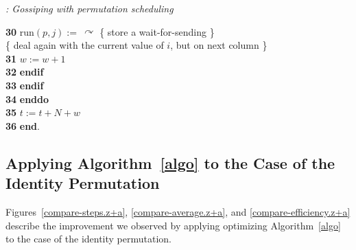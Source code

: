 \documentclass{elsart}
\newcommand{\keyw}[1]{\hbox{\bf #1}}
\begin{document}
\begin{alg}{\emph{: Gossiping with permutation scheduling}}
\begin{tabbing}
{\bf 30} \> \> \> \> \> \> $\mathrm{run}(p,  j) :=  \ \curvearrowright$ \>\>\>\>\>\>\> \{ store a wait-for-sending \} \\
         \> \> \> \> \> \> \{ deal again with the current value of $i$, but on next column \}\\
{\bf 31} \> \> \> \> \> \> $w := w+1$ \\
{\bf 32} \> \> \> \> \> \keyw{endif}\\
{\bf 33} \> \> \> \> \keyw{endif}\\
{\bf 34} \> \> \> \keyw{enddo}\\
{\bf 35} \> \> \> $t := t + N + w$\\
{\bf 36} \> \> \keyw{end}.
\end{tabbing}
\label{algo}
\end{alg}


\subsection{Applying Algorithm~\ref{algo} to the 
	    Case of the Identity Permutation}\label{algoz+a}

Figures~\ref{compare-steps.z+a}, \ref{compare-average.z+a}, and
\ref{compare-efficiency.z+a} describe the improvement we observed
by applying optimizing Algorithm~\ref{algo} to the case
of the identity permutation.
\end{document}
